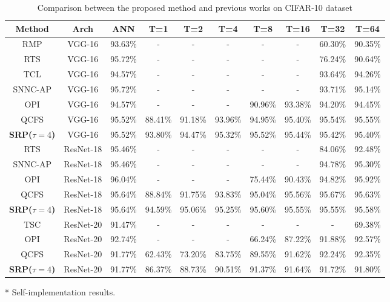 \documentclass[letterpaper]{article} %
\begin{document}
\begin{table}[]
    \caption{Comparison between the proposed method and previous works on CIFAR-10 dataset}
    \renewcommand\arraystretch{1.15}
	\centering
        \begin{threeparttable}
	\begin{tabular}{cccccccccc}\hline
	
	Method & Arch & ANN & T=1 & T=2 & T=4 & T=8 & T=16 & T=32 & T=64\\ \hline
	
	RMP & VGG-16 & 93.63\% & - & - & - & - & - & 60.30\% & 90.35\% \\\hline
	RTS & VGG-16 & 95.72\% & - & - & - & - & - & 76.24\% & 90.64\% \\\hline
	TCL\tnote{*} & VGG-16 & 94.57\% & - & - & - & - & - & 93.64\% & 94.26\% \\\hline
	SNNC-AP & VGG-16 & 95.72\% & - & - & - & - & - & 93.71\% & 95.14\%  \\\hline
	OPI & VGG-16 & 94.57\% & - & - & - & 90.96\% & 93.38\% & 94.20\% & 94.45\%  \\\hline
	QCFS & VGG-16 & 95.52\% & 88.41\% & 91.18\% & 93.96\% & 94.95\% & 95.40\% & 95.54\% & 95.55\% \\\hline
	\textbf{SRP($\tau=4$)} & VGG-16 & 95.52\% & 93.80\% & 94.47\% & 95.32\% & 95.52\% & 95.44\% & 95.42\% & 95.40\% \\ \hline

	RTS & ResNet-18 & 95.46\% & - & - & - & - & - & 84.06\% & 92.48\% \\\hline
	SNNC-AP & ResNet-18 & 95.46\% & - & - & - & - & - & 94.78\% & 95.30\% \\\hline
	OPI & ResNet-18 & 96.04\% & - & - & - & 75.44\% & 90.43\% & 94.82\% & 95.92\%  \\\hline
	QCFS & ResNet-18 & 95.64\% & 88.84\% & 91.75\% & 93.83\% & 95.04\% & 95.56\% & 95.67\% & 95.63\% \\\hline
	\textbf{SRP($\tau=4$)} & ResNet-18 & 95.64\% & 94.59\% & 95.06\% & 95.25\% & 95.60\% & 95.55\% & 95.55\% & 95.58\% \\ \hline

	TSC & ResNet-20 & 91.47\% & - & - & - & - & - & - & 69.38\% \\\hline
	OPI & ResNet-20 & 92.74\% & - & - & - & 66.24\% & 87.22\% & 91.88\% & 92.57\%  \\\hline
	QCFS & ResNet-20 & 91.77\% & 62.43\% & 73.20\% & 83.75\% & 89.55\% & 91.62\% & 92.24\% & 92.35\% \\\hline
	\textbf{SRP($\tau=4$)} & ResNet-20 & 91.77\% & 86.37\% & 88.73\% & 90.51\% & 91.37\% & 91.64\% & 91.72\% & 91.80\% \\ \hline
	
	\end{tabular}
        \begin{tablenotes}
        \footnotesize
        \item[*] Self-implementation results.
        \end{tablenotes}
        \end{threeparttable}
	\label{table07}
\end{table}
\end{document}
